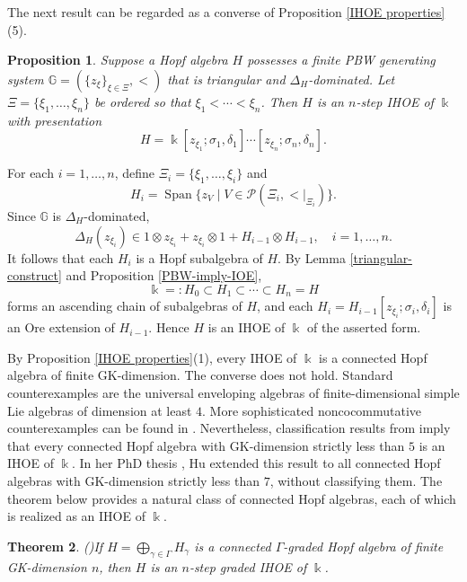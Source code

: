 \documentclass{article}
\makeatletter
\renewenvironment{proof}[1][\proofname]{\par
	\pushQED{\qed}%
	\normalfont \topsep6\p@\@plus6\p@\relax
	\trivlist
	\item[\hskip\labelsep
	\bfseries
	#1\@addpunct{.}]\ignorespaces
}{%
	\popQED\endtrivlist\@endpefalse
}
\theoremstyle{plain}
\newtheorem{thm}{Theorem}[section]
\newtheorem{prop}[thm]{Proposition}
\theoremstyle{definition}
\numberwithin{equation}{section}
\DeclareMathOperator{\Span}{Span}
\newcommand{\GG}{\mathbb{G}}
\makeatother
\begin{document}
	The next result can be regarded as a converse of Proposition \ref{IHOE properties} (5).
	
	\begin{prop}\label{PBW-imply-IHOE}
		Suppose a Hopf algebra $H$ possesses a finite PBW generating system $\GG=(\{z_{\xi}\}_{\xi\in \Xi}, <)$ that is triangular and $\Delta_{H}$-dominated. Let $\Xi=\{\xi_{1},\ldots, \xi_{n}\}$ be ordered so that $\xi_{1} < \cdots < \xi_{n}$. Then $H$ is an $n$-step IHOE of $\Bbbk$ with presentation
		\[
		H=\Bbbk[z_{\xi_{1}};\sigma_{1},\delta_{1}]\cdots [z_{\xi_{n}};\sigma_{n},\delta_{n}].
		\]
	\end{prop}
	
	\begin{proof}
		For each $i=1,\ldots, n$, define $\Xi_{i}= \{\xi_{1},\ldots, \xi_{i}\}$ and
		\[
		H_{i} = \Span\{z_{V} \mid V\in \mathcal{P}(\Xi_{i}, {<}|_{\Xi_{i}})\}.
		\]
		Since $\GG$ is $\Delta_{H}$-dominated,
		\[
		\Delta_{H}(z_{\xi_{i}}) \in 1\otimes z_{\xi_{i}} + z_{\xi_{i}} \otimes 1 + H_{i-1} \otimes H_{i-1},\quad i=1,\ldots, n.
		\]
		It follows that each $H_{i}$ is a Hopf subalgebra of $H$.
		By Lemma \ref{triangular-construct} and Proposition \ref{PBW-imply-IOE},
		\[
		\Bbbk=:H_{0} \subset H_{1} \subset \cdots \subset H_{n} =H
		\]
		forms an ascending chain of subalgebras of $H$, and each $H_{i} = H_{i-1}[z_{\xi_{i}};\sigma_{i},\delta_{i}]$ is an Ore extension of $H_{i-1}$. Hence $H$ is an IHOE of $\Bbbk$ of the asserted form.
	\end{proof}
	
	By Proposition \ref{IHOE properties}(1), every IHOE of $\Bbbk$ is a connected Hopf algebra of finite GK-dimension. The converse does not hold. Standard counterexamples are the universal enveloping algebras of finite-dimensional simple Lie algebras of dimension at least $4$. More sophisticated noncocommutative counterexamples can be found in \cite{HW26}. Nevertheless, classification results from \cite{Zh13, WZZ15} imply that every connected Hopf algebra with GK-dimension strictly less than $5$ is an IHOE of $\Bbbk$. In her PhD thesis \cite{Hu26}, Hu extended this result to all connected Hopf algebras with GK-dimension strictly less than $7$, without classifying them. The theorem below provides a natural class of connected Hopf algebras, each of which is realized as an IHOE of $\Bbbk$.
	
	\begin{thm}(\cite[Theorem B]{ZSL20})\label{Graded-imply-IHOE}
		If $H=\bigoplus_{\gamma\in\Gamma} H_{\gamma}$ is a connected $\Gamma$-graded Hopf algebra of finite GK-dimension $n$, then $H$ is an $n$-step graded IHOE of $\Bbbk$.
	\end{thm}
	
\end{document}
